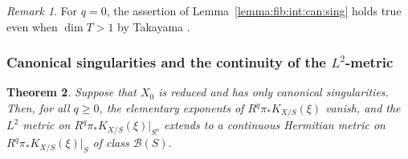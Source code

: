 \documentclass[amscd, leqno]{amsart}
\theoremstyle{plain}
\newtheorem{theorem}{Theorem}[section]
\theoremstyle{definition}
\theoremstyle{remark}
\newtheorem{remark}[theorem]{Remark}
\begin{document}
\begin{remark}
For $q=0$, the assertion of Lemma~\ref{lemma:fib:int:can:sing} holds true even when $\dim T >1$ by Takayama \cite[Prop.\,3.2.3 (2)]{Takayama19}.
\end{remark}



\subsubsection
{Canonical singularities and the continuity of the $L^{2}$-metric}
\label{sect:5.3.2}
\par


\begin{theorem}
\label{cont:L2:can:sing}
Suppose that $X_{0}$ is reduced and has only canonical singularities. 
Then, for all $q\geq0$, the elementary exponents of $R^{q}\pi_{*}K_{X/S}(\xi)$ vanish,
and the $L^{2}$ metric on $R^{q}\pi_{*}K_{X/S}(\xi)|_{S^{o}}$ extends to a continuous Hermitian metric on $R^{q}\pi_{*}K_{X/S}(\xi)|_{S}$ 
of class ${\mathcal B}(S)$. 
\end{theorem}
\end{document}
